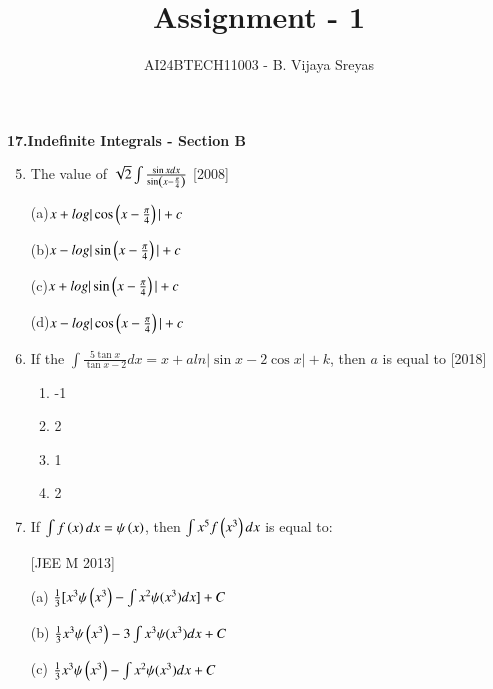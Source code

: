 \documentclass[journal,12pt,twocolumn]{IEEEtran}
\theoremstyle{remark}
\begin{document}

\vspace{3cm}

\title{Assignment - 1}
\author{AI24BTECH11003 - B. Vijaya Sreyas}
\maketitle
\newpage
\bigskip

\renewcommand{\thefigure}{\theenumi}
\renewcommand{\thetable}{\theenumi}

\maketitle\large{\textbf{17.Indefinite Integrals - Section B}}\small
\medskip

\begin{enumerate}[label=\textcolor{black}{\arabic*.}]
		\setcounter{enumi}{4}
	\item The value of $\sqrt{2}\int\frac{\sin xdx}{\sin \left(x-\frac{\pi}{4}\right)}$
		\hfill{[2008]}

		(a)$x+log|\cos \left(x-\frac{\pi}{4}\right)|+c$

		(b)$x-log|\sin \left(x-\frac{\pi}{4}\right)|+c$

		(c)$x+log|\sin \left(x-\frac{\pi}{4}\right)|+c$

		(d)$x-log|\cos \left(x-\frac{\pi}{4}\right)|+c$

	\item If the $\int\frac{5\tan x}{\tan x-2}dx=x+aln|\sin x-2\cos x|+k$, then $a$ is equal to
		\hfill{[2018]}

		\begin{multicols}{4}
			\begin{enumerate}[label=(\alph*)]
				\item -1
				\item 2
				\item 1
				\item 2
			\end{enumerate}
		\end{multicols}
		
	\item If $\int f\left(x\right)dx=\psi\left(x\right)$, then $\int x^5f\left(x^3\right)dx$ is equal to:

		\hfill{[JEE M 2013]}

		(a) $\frac{1}{3}[x^3\psi\left(x^3\right)-\int x^2\psi(x^3)dx] + C$

		(b) $\frac{1}{3}x^3\psi\left(x^3\right)-3\int x^3\psi(x^3)dx + C$

		(c) $\frac{1}{3}x^3\psi\left(x^3\right)-\int x^2\psi(x^3)dx + C$


\end{enumerate}
\end{document}
